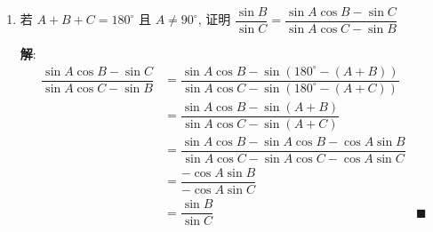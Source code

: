 \documentclass{report}
\newcommand{\sol}{\vspace{0.2cm}\textbf{解}:}
\begin{document}
\begin{enumerate}[leftmargin=*]
    \sol{}
    \begin{align*}
        \sin B &= \dfrac{\sin A + \sin C}{2} \\
        \sin [180^{\circ} - (A + C)] &= \dfrac{\sin A + \sin C}{2} \\
        \sin (A + C) &= \dfrac{\sin A + \sin C}{2} \\
        \sin (A + C) &= \sin \dfrac{A + C}{2} \cos \dfrac{A - C}{2}\\
        2\sin \dfrac{A + C}{2} \cos \dfrac{A + C}{2} &= \sin \dfrac{A + C}{2} \cos \dfrac{A - C}{2} \\
        2\cos \dfrac{A + C}{2} &= \cos \dfrac{A - C}{2} \\
        \cot \dfrac{A}{2} \cot \dfrac{C}{2} &= \dfrac{\cos \dfrac{A}{2} \cos \dfrac{C}{2}}{\sin \dfrac{A}{2} \sin \dfrac{C}{2}} = \dfrac{\cos\dfrac{A+C}{2} + \cos\dfrac{A-C}{2}}{\cos\dfrac{A-C}{2} - \cos\dfrac{A+C}{2}} \\
        & = \dfrac{\cos\dfrac{A+C}{2} + 2\cos \dfrac{A + C}{2}}{2\cos \dfrac{A + C}{2} - \cos\dfrac{A+C}{2}} \\
        & = \dfrac{3\cos \dfrac{A + C}{2}}{\cos \dfrac{A + C}{2}} = 3 &\blacksquare
    \end{align*}

    \item 若 $A+B+C=180^{\circ}$ 且 $A \neq 90^{\circ}$, 证明 $\dfrac{\sin B}{\sin C}=\dfrac{\sin A \cos B-\sin C}{\sin A \cos C-\sin B}$
    
    \sol{}
    \begin{align*}
        \dfrac{\sin A \cos B-\sin C}{\sin A \cos C-\sin B} &= \dfrac{\sin A\cos B - \sin(180^{\circ} - (A + B))}{\sin A\cos C - \sin(180^{\circ} - (A + C))} \\
        & = \dfrac{\sin A\cos B - \sin(A + B)}{\sin A\cos C - \sin(A + C)} \\
        & = \dfrac{\sin A\cos B - \sin A\cos B - \cos A\sin B}{\sin A\cos C - \sin A\cos C - \cos A\sin C} \\
        & = \dfrac{-\cos A\sin B}{-\cos A\sin C} \\
        & = \dfrac{\sin B}{\sin C} &\blacksquare
    \end{align*}
\end{enumerate}
\end{document}
